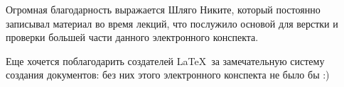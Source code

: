 \documentclass[../main.tex]{subfiles}
\begin{document}
{    \smallskip
    
    Огромная благодарность выражается Шляго Никите, который постоянно записывал
    материал во время лекций, что послужило основой для верстки и проверки
    большей части данного электронного конспекта.
    
    
    \smallskip
    
    Еще хочется поблагодарить создателей \LaTeX\ за замечательную 
    систему создания документов: без них этого электронного 
    конспекта не было бы :)
}

\pagebreak
\end{document}
